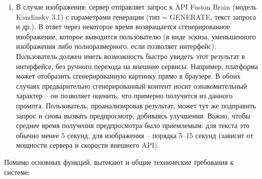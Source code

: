 \begin{enumerate}[label=\arabic*]
\begin{enumerate}[label=4.\arabic*]
        \item В случае изображения: сервер отправляет запрос к API Fusion Brain (модель Kandinsky 3.1) с параметрами генерации (тип = GENERATE, текст запроса и др.). В ответ через некоторое время возвращается сгенерированное изображение, которое выводится пользователю (в виде эскиза, уменьшенного изображения либо полноразмерного, если позволяет интерфейс). Пользователь должен иметь возможность быстро увидеть этот результат в интерфейсе, без ручного перехода на внешние сервисы. Например, платформа может отобразить сгенерированную картинку прямо в браузере. В обоих случаях предварительно сгенерированный контент носит ознакомительный характер – он позволяет оценить, что примерно получится из данного промпта. Пользователь, проанализировав результат, может тут же подправить запрос и снова вызвать предпросмотр, добиваясь улучшения. Важно, чтобы среднее время получения предпросмотра было приемлемым: для текста это обычно менее 5 секунд, для изображения – порядка 5–15 секунд (зависит от мощности сервера и скорости внешнего API).
    \end{enumerate}
\end{enumerate}
Помимо основных функций, вытекают и общие технические требования к системе: 
